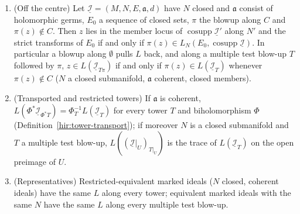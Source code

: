 \begin{proposition}
\begin{enumerate}
\item (Off the centre) Let \(\underline{\mathcal I}=(M,N,E,\mathfrak a,d)\) have \(N\) closed and \(\mathfrak a\) consist of holomorphic germs, \(E_0\) a sequence of closed sets, \(\pi\) the
blowup along \(C\) and \(\pi(z)\notin C\). Then \(z\) lies in the member locus of \(\operatorname{cosupp}\underline{\mathcal I}'\) along \(N'\) and the strict transforms of \(E_0\) if and
only if \(\pi(z)\in L_N(E_0,\operatorname{cosupp}\underline{\mathcal I})\). In particular a blowup along \(\emptyset\) pulls \(L\) back, and along a multiple test blow-up \(T\)
followed by \(\pi\), \(z\in L(\underline{\mathcal I}_{T\pi})\) if and only if \(\pi(z)\in L(\underline{\mathcal I}_T)\) whenever \(\pi(z)\notin C\) (\(N\) a closed submanifold,
\(\mathfrak a\) coherent, closed members).
\item (Transported and restricted towers) If \(\mathfrak a\) is coherent, \(L(\Phi^*\underline{\mathcal I}_{\Phi^*T})=\Phi_T^{-1}L(\underline{\mathcal I}_T)\) for every tower \(T\) and
biholomorphism \(\Phi\) (Definition~\ref{hir:tower-transport}); if moreover \(N\) is a closed submanifold and \(T\) a multiple test blow-up, \(L((\underline{\mathcal I}|_U)_{T|_U})\)
is the trace of \(L(\underline{\mathcal I}_T)\) on the open preimage of \(U\).
\item (Representatives) Restricted-equivalent marked ideals (\(N\) closed, coherent ideals) have the same \(L\) along every tower; equivalent marked ideals with
the same \(N\) have the same \(L\) along every multiple test blow-up.
\end{enumerate}
\end{proposition}
